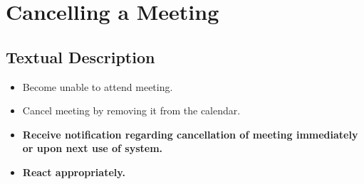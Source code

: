 \documentclass{article}
\begin{document}
\section{Cancelling a Meeting}

\subsection{Textual Description}

\begin{itemize}
\item Become unable to attend meeting.

\item Cancel meeting by removing it from the calendar.

\item \textbf{Receive notification regarding cancellation of meeting
immediately or upon next use of system.}

\item \textbf{React appropriately.}
\end{itemize}
\end{document}
